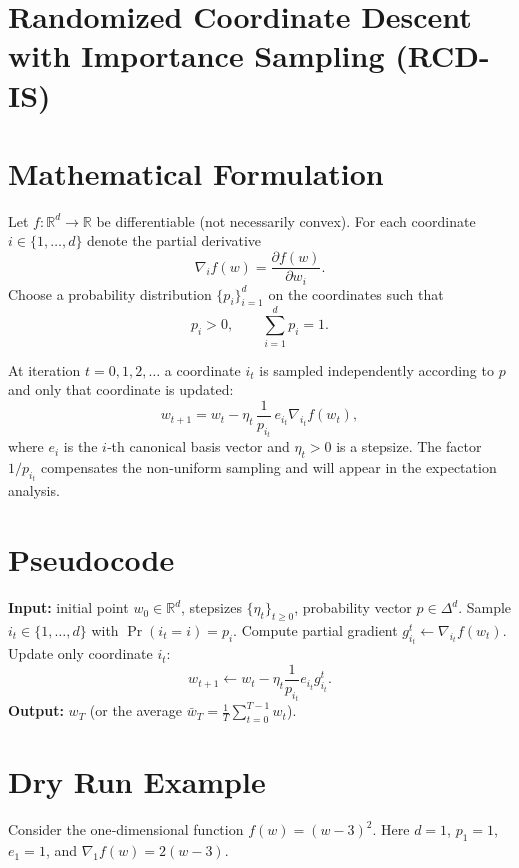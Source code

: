 \documentclass{article}
\newcommand{\R}{\mathbb{R}}
\begin{document}
\section*{Randomized Coordinate Descent with Importance Sampling (RCD-IS)}

\section*{Mathematical Formulation}
Let $f:\R^{d}\rightarrow\R$ be differentiable (not necessarily convex).  
For each coordinate $i\in\{1,\dots,d\}$ denote the partial derivative
\[
\nabla_{i}f(w)=\frac{\partial f(w)}{\partial w_{i}} .
\]
Choose a probability distribution $\{p_{i}\}_{i=1}^{d}$ on the coordinates such that
\[
p_{i}>0,\qquad \sum_{i=1}^{d}p_{i}=1 .
\]

At iteration $t=0,1,2,\dots$ a coordinate $i_{t}$ is sampled independently
according to $p$ and only that coordinate is updated:
\[
w_{t+1}=w_{t}-\eta_{t}\,\frac{1}{p_{i_{t}}}\,e_{i_{t}}\nabla_{i_{t}}f(w_{t}),
\tag{1}
\]
where $e_{i}$ is the $i$‑th canonical basis vector and $\eta_{t}>0$ is a stepsize.
The factor $1/p_{i_{t}}$ compensates the non‑uniform sampling and will appear
in the expectation analysis.

\section*{Pseudocode}
\begin{algorithm}[H]
\caption{RCD-IS}
\begin{algorithmic}[1]
\State \textbf{Input:} initial point $w_{0}\in\R^{d}$, stepsizes $\{\eta_{t}\}_{t\ge0}$,
probability vector $p\in\Delta^{d}$.
    \State Sample $i_{t}\in\{1,\dots,d\}$ with $\Pr(i_{t}=i)=p_{i}$.
    \State Compute partial gradient $g_{i_{t}}^{t}\gets \nabla_{i_{t}}f(w_{t})$.
    \State Update only coordinate $i_{t}$:
    \[
    w_{t+1}\gets w_{t}-\eta_{t}\frac{1}{p_{i_{t}}}e_{i_{t}}g_{i_{t}}^{t}.
    \]
\EndFor
\State \textbf{Output:} $w_{T}$ (or the average $\bar w_{T}= \frac1T\sum_{t=0}^{T-1}w_{t}$).
\end{algorithmic}
\end{algorithm}

\section*{Dry Run Example}
Consider the one‑dimensional function $f(w)=(w-3)^{2}$.
Here $d=1$, $p_{1}=1$, $e_{1}=1$, and $\nabla_{1}f(w)=2(w-3)$.
\end{document}
